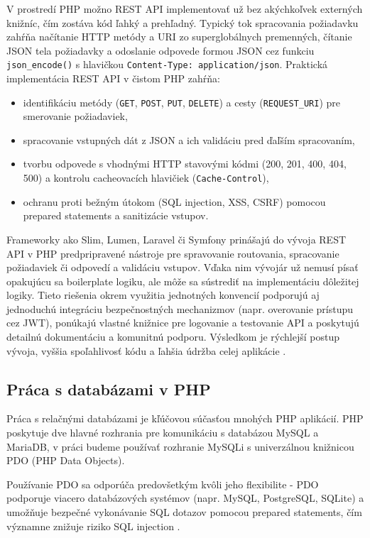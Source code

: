 V prostredí PHP možno REST API implementovať už bez akýchkoľvek externých knižníc, čím zostáva kód ľahký a prehľadný. 
Typický tok spracovania požiadavku zahŕňa načítanie HTTP metódy a URI zo superglobálnych premenných, čítanie JSON tela 
požiadavky a odoslanie odpovede formou JSON cez funkciu \texttt{json\_encode()} s hlavičkou 
\texttt{Content-Type: application/json}.  
Praktická implementácia REST API v čistom PHP zahŕňa:
\begin{itemize}
    \item identifikáciu metódy (\texttt{GET}, \texttt{POST}, \texttt{PUT}, \texttt{DELETE}) a cesty (\texttt{REQUEST\_URI}) pre 
  smerovanie požiadaviek,  
    \item spracovanie vstupných dát z JSON a ich validáciu pred ďaľším spracovaním,  
    \item tvorbu odpovede s vhodnými HTTP stavovými kódmi (200, 201, 400, 404, 500) a kontrolu cacheovacích hlavičiek 
  (\texttt{Cache-Control}),  
    \item ochranu proti bežným útokom (SQL injection, XSS, CSRF) pomocou prepared statements a sanitizácie vstupov.
\end{itemize}
Frameworky ako Slim, Lumen, Laravel či Symfony prinášajú do vývoja REST API v PHP predpripravené nástroje pre spravovanie 
routovania, spracovanie požiadaviek či odpovedí a validáciu vstupov. Vďaka nim vývojár už nemusí písať opakujúcu sa boilerplate 
logiku, ale môže sa sústrediť na implementáciu dôležitej logiky. Tieto riešenia okrem využitia jednotných konvencií podporujú 
aj jednoduchú integráciu bezpečnostných mechanizmov (napr. overovanie prístupu cez JWT), ponúkajú vlastné knižnice pre logovanie 
a testovanie API a poskytujú detailnú dokumentáciu a komunitnú podporu. Výsledkom je rýchlejší postup vývoja, vyššia spoľahlivosť 
kódu a ľahšia údržba celej aplikácie \cite{wpwebinfotech_simple_rest_php}.

\subsection{Práca s databázami v PHP}
\label{subsec:pracasdbvphp}

Práca s relačnými databázami je kľúčovou súčasťou mnohých PHP aplikácií. PHP poskytuje dve hlavné rozhrania pre komunikáciu 
s databázou MySQL a MariaDB, v práci budeme používať rozhranie MySQLi s univerzálnou knižnicou PDO (PHP Data Objects). 

Používanie PDO sa odporúča predovšetkým kvôli jeho flexibilite - PDO podporuje viacero databázových systémov (napr. MySQL, PostgreSQL, SQLite) a 
umožňuje bezpečné vykonávanie SQL dotazov pomocou prepared statements, čím významne znižuje riziko SQL 
injection \cite{php_manual_pdo}.

